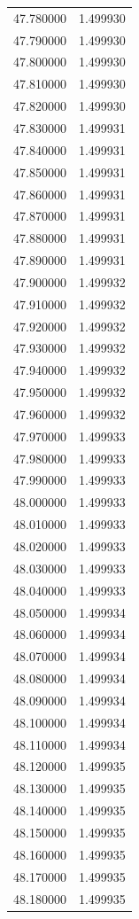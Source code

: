 \begin{tabular}{rr}
47.780000 & 1.499930 \\
47.790000 & 1.499930 \\
47.800000 & 1.499930 \\
47.810000 & 1.499930 \\
47.820000 & 1.499930 \\
47.830000 & 1.499931 \\
47.840000 & 1.499931 \\
47.850000 & 1.499931 \\
47.860000 & 1.499931 \\
47.870000 & 1.499931 \\
47.880000 & 1.499931 \\
47.890000 & 1.499931 \\
47.900000 & 1.499932 \\
47.910000 & 1.499932 \\
47.920000 & 1.499932 \\
47.930000 & 1.499932 \\
47.940000 & 1.499932 \\
47.950000 & 1.499932 \\
47.960000 & 1.499932 \\
47.970000 & 1.499933 \\
47.980000 & 1.499933 \\
47.990000 & 1.499933 \\
48.000000 & 1.499933 \\
48.010000 & 1.499933 \\
48.020000 & 1.499933 \\
48.030000 & 1.499933 \\
48.040000 & 1.499933 \\
48.050000 & 1.499934 \\
48.060000 & 1.499934 \\
48.070000 & 1.499934 \\
48.080000 & 1.499934 \\
48.090000 & 1.499934 \\
48.100000 & 1.499934 \\
48.110000 & 1.499934 \\
48.120000 & 1.499935 \\
48.130000 & 1.499935 \\
48.140000 & 1.499935 \\
48.150000 & 1.499935 \\
48.160000 & 1.499935 \\
48.170000 & 1.499935 \\
48.180000 & 1.499935 \\

\end{tabular}
